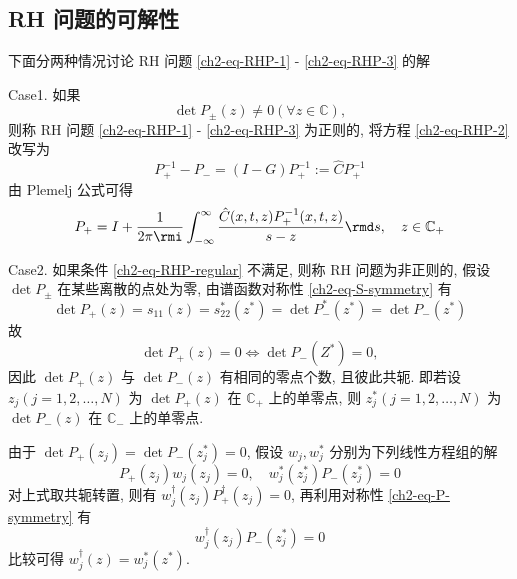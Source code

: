 \subsection{RH 问题的可解性}
下面分两种情况讨论 RH 问题 \eqref{ch2-eq-RHP-1} - \eqref{ch2-eq-RHP-3} 的解

Case1. 如果
\begin{equation}
    \det P_{\pm} (z) \neq 0 (\forall z \in \mathbb{C}), \label{ch2-eq-RHP-regular}
\end{equation}
则称 RH 问题 \eqref{ch2-eq-RHP-1} - \eqref{ch2-eq-RHP-3} 为正则的, 将方程 \eqref{ch2-eq-RHP-2} 改写为
\begin{equation}
    P^{-1}_{+} - P_{-} = (I - G)P^{-1}_{+} := \hat{C} P^{-1}_{+}
\end{equation}
由 Plemelj 公式可得
\begin{equation}
    P_{+} = I + \frac{1}{2 \pi \rmi} \int_{-\infty}^{\infty} \frac{\hat{C}(x,t,z) P_{+}^{-1}(x,t,z)}{s - z} \rmd s, \quad z \in \mathbb{C}_{+}
\end{equation}

Case2. 如果条件 \eqref{ch2-eq-RHP-regular} 不满足, 则称 RH 问题为非正则的, 假设 $ \det P_{\pm} $ 在某些离散的点处为零, 由谱函数对称性 \eqref{ch2-eq-S-symmetry} 有
\begin{equation}
    \det P_{+}(z) = s_{11}(z) = s_{22}^{*}(z^{*}) = \det P_{-}^{*}(z^{*}) = \det P_{-}(z^{*})
\end{equation}
故
\begin{equation}
    \det P_{+}(z) = 0 \iff \det P_{-}(Z^{*}) = 0,
\end{equation}
因此 $ \det P_{+}(z) $ 与 $ \det P_{-}(z) $ 有相同的零点个数, 且彼此共轭. 即若设 $ z_{j} (j = 1,2, \dots , N) $ 为 $ \det P_{+}(z) $ 在 $ \mathbb{C}_{+} $ 上的单零点, 则 $ z^{*}_{j} (j = 1,2, \dots , N) $ 为 $ \det P_{-}(z) $ 在 $ \mathbb{C}_{-} $ 上的单零点.

由于 $ \det P_{+}(z_{j}) = \det P_{-}(z^{*}_{j}) = 0 $, 假设 $ w_{j}, w_{j}^{*} $ 分别为下列线性方程组的解
\begin{equation}
    P_{+}(z_{j}) w_{j}(z_{j}) = 0, \quad w_{j}^{*}(z_{j}^{*}) P_{-}(z_{j}^{*})  = 0 \label{ch2-eq-RHP-singular}
\end{equation}
对上式取共轭转置, 则有 $ w_{j}^{\dagger}(z_{j}) P_{+}^{\dagger}(z_{j})  = 0 $, 再利用对称性 \eqref{ch2-eq-P-symmetry} 有
\begin{equation}
    w_{j}^{\dagger}(z_{j}) P_{-}(z_{j}^{*})  = 0 \label{ch2-eq-RHP-singular-Hermitian}
\end{equation}
比较可得 $ w_{j}^{\dagger}(z) = w_{j}^{*}(z^{*}) $.

